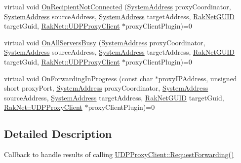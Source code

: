 \begin{DoxyCompactItemize}
\item 
virtual void \hyperlink{struct_rak_net_1_1_u_d_p_proxy_client_result_handler_a42c32a851a4173b83f677670d572ecee}{On\-Recipient\-Not\-Connected} (\hyperlink{struct_rak_net_1_1_system_address}{System\-Address} proxy\-Coordinator, \hyperlink{struct_rak_net_1_1_system_address}{System\-Address} source\-Address, \hyperlink{struct_rak_net_1_1_system_address}{System\-Address} target\-Address, \hyperlink{struct_rak_net_1_1_rak_net_g_u_i_d}{Rak\-Net\-G\-U\-I\-D} target\-Guid, \hyperlink{class_rak_net_1_1_u_d_p_proxy_client}{Rak\-Net\-::\-U\-D\-P\-Proxy\-Client} $\ast$proxy\-Client\-Plugin)=0
\item 
virtual void \hyperlink{struct_rak_net_1_1_u_d_p_proxy_client_result_handler_a853ff8a85427e781da31430333e3f0ff}{On\-All\-Servers\-Busy} (\hyperlink{struct_rak_net_1_1_system_address}{System\-Address} proxy\-Coordinator, \hyperlink{struct_rak_net_1_1_system_address}{System\-Address} source\-Address, \hyperlink{struct_rak_net_1_1_system_address}{System\-Address} target\-Address, \hyperlink{struct_rak_net_1_1_rak_net_g_u_i_d}{Rak\-Net\-G\-U\-I\-D} target\-Guid, \hyperlink{class_rak_net_1_1_u_d_p_proxy_client}{Rak\-Net\-::\-U\-D\-P\-Proxy\-Client} $\ast$proxy\-Client\-Plugin)=0
\item 
virtual void \hyperlink{struct_rak_net_1_1_u_d_p_proxy_client_result_handler_a7c3b5f02ddd9f84c904c809e0659e43c}{On\-Forwarding\-In\-Progress} (const char $\ast$proxy\-I\-P\-Address, unsigned short proxy\-Port, \hyperlink{struct_rak_net_1_1_system_address}{System\-Address} proxy\-Coordinator, \hyperlink{struct_rak_net_1_1_system_address}{System\-Address} source\-Address, \hyperlink{struct_rak_net_1_1_system_address}{System\-Address} target\-Address, \hyperlink{struct_rak_net_1_1_rak_net_g_u_i_d}{Rak\-Net\-G\-U\-I\-D} target\-Guid, \hyperlink{class_rak_net_1_1_u_d_p_proxy_client}{Rak\-Net\-::\-U\-D\-P\-Proxy\-Client} $\ast$proxy\-Client\-Plugin)=0
\end{DoxyCompactItemize}


\subsection{Detailed Description}
Callback to handle results of calling \hyperlink{class_rak_net_1_1_u_d_p_proxy_client_a94ee5defadaa018d15de5ed2498625ad}{U\-D\-P\-Proxy\-Client\-::\-Request\-Forwarding()} 

